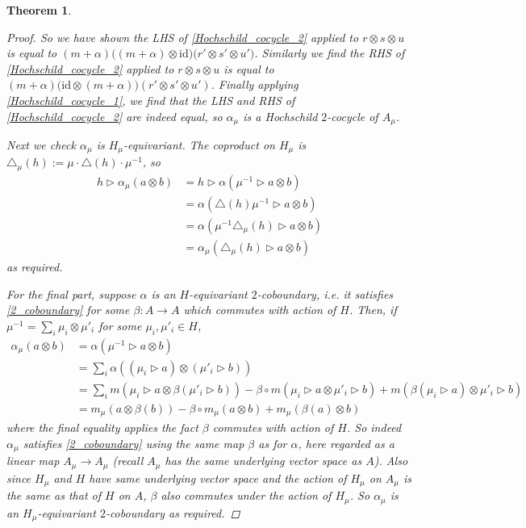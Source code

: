 \documentclass[10pt]{article}
\newcommand{\bb}{\medbreak}
\newcommand{\nt}{\noindent}
\newcommand{\rt}{\xrightarrow{}}
\newcommand{\cd}{\cdot}
\newcommand{\id}{\text{id}}
\newcommand{\al}{\alpha}
\newtheorem{theorem}[lemma]{Theorem}
\theoremstyle{definition}
\begin{document}
\begin{theorem}
\begin{proof}

\nt So we have shown the LHS of \eqref{Hochschild_cocycle_2} applied to $r\otimes s\otimes u$ is equal to $(m+\alpha)\big((m+\alpha)\otimes \id\big)\big( r'\otimes s'\otimes u' \big)$. Similarly we find the RHS of \eqref{Hochschild_cocycle_2} applied to $r\otimes s\otimes u$ is equal to $(m+\alpha)\big(\id\otimes (m+\alpha)\big)(r'\otimes s'\otimes u')$. Finally applying \eqref{Hochschild_cocycle_1}, we find that the LHS and RHS of \eqref{Hochschild_cocycle_2} are indeed equal, so $\alpha_\mu$ is a Hochschild $2$-cocycle of $A_\mu$.\bb
\fi

\nt Next we check $\alpha_\mu$ is $H_\mu$-equivariant. The coproduct on $H_\mu$ is $\triangle_\mu(h):=\mu\cd \triangle(h)\cd \mu^{-1}$, so
\begin{align*}
h\rhd \al_\mu (a\otimes b) & =h\rhd \al (\mu^{-1}\rhd a\otimes b)\\
& = \al (\triangle(h)\mu^{-1}\rhd a\otimes b)\\
& = \al (\mu^{-1}\triangle_\mu(h)\rhd a\otimes b)\\
& = \al_\mu (\triangle_\mu(h)\rhd a\otimes b)
\end{align*}
as required.\bb %

\nt For the final part, suppose $\alpha$ is an $H$-equivariant $2$-coboundary, i.e. it satisfies \eqref{2_coboundary} for some $\beta:A\rt A$ which commutes with action of $H$. Then, if $\mu^{-1}=\sum_i \mu_i\otimes \mu'_i$ for some $\mu_i,\mu'_i\in H$,
\begin{align*}
  \al_\mu(a\otimes b) & =\al(\mu^{-1}\rhd a\otimes b)\\
  & = \sum_i \al((\mu_i\rhd a)\otimes (\mu'_i\rhd b))\\
  & = \sum_i m(\mu_i\rhd a\otimes \beta(\mu'_i\rhd b))-\beta\circ m(\mu_i\rhd a\otimes \mu'_i\rhd b)+m(\beta(\mu_i\rhd a)\otimes \mu'_i\rhd b)\\
  & = m_\mu(a\otimes \beta(b))-\beta\circ m_\mu(a\otimes b)+m_\mu(\beta(a)\otimes b)
  \end{align*}
where the final equality applies the fact $\beta$ commutes with action of $H$. So indeed $\al_\mu$ satisfies \eqref{2_coboundary} using the same map $\beta$ as for $\al$, here regarded as a linear map $A_\mu \rt A_\mu$ (recall $A_\mu$ has the same underlying vector space as $A$). Also since $H_\mu$ and $H$ have same underlying vector space and the action of $H_\mu$ on $A_\mu$ is the same as that of $H$ on $A$, $\beta$ also commutes under the action of $H_\mu$. So $\al_\mu$ is an $H_\mu$-equivariant $2$-coboundary as required.  
\end{proof}
\end{theorem}
\end{document}
